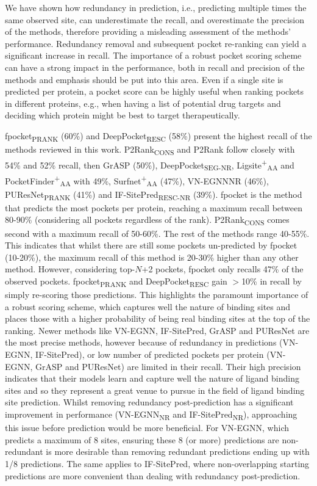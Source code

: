 We have shown how redundancy in prediction, i.e., predicting multiple times the same observed site, can underestimate the recall, and overestimate the precision of the methods, therefore providing a misleading assessment of the methods’ performance. Redundancy removal and subsequent pocket re-ranking can yield a significant increase in recall. The importance of a robust pocket scoring scheme can have a strong impact in the performance, both in recall and precision of the methods and emphasis should be put into this area. Even if a single site is predicted per protein, a pocket score can be highly useful when ranking pockets in different proteins, e.g., when having a list of potential drug targets and deciding which protein might be best to target therapeutically.

fpocket\textsubscript{PRANK} (60\%) and DeepPocket\textsubscript{RESC} (58\%) present the highest recall of the methods reviewed in this work. P2Rank\textsubscript{CONS} and P2Rank follow closely with 54\% and 52\% recall, then GrASP (50\%), DeepPocket\textsubscript{SEG-NR}, Ligsite\textsuperscript{+}\textsubscript{AA} and PocketFinder\textsuperscript{+}\textsubscript{AA} with 49\%, Surfnet\textsuperscript{+}\textsubscript{AA} (47\%), VN-EGNNNR (46\%), PUResNet\textsubscript{PRANK} (41\%) and IF-SitePred\textsubscript{RESC-NR} (39\%). fpocket is the method that predicts the most pockets per protein, reaching a maximum recall between 80-90\% (considering all pockets regardless of the rank). P2Rank\textsubscript{CONS} comes second with a maximum recall of 50-60\%. The rest of the methods range 40-55\%. This indicates that whilst there are still some pockets un-predicted by fpocket (10-20\%), the maximum recall of this method is 20-30\% higher than any other method. However, considering top-$N$+2 pockets, fpocket only recalls 47\% of the observed pockets. fpocket\textsubscript{PRANK} and DeepPocket\textsubscript{RESC} gain $>$10\% in recall by simply re-scoring those predictions. This highlights the paramount importance of a robust scoring scheme, which captures well the nature of binding sites and places those with a higher probability of being real binding sites at the top of the ranking. Newer methods like VN-EGNN, IF-SitePred, GrASP and PUResNet are the most precise methods, however because of redundancy in predictions (VN-EGNN, IF-SitePred), or low number of predicted pockets per protein (VN-EGNN, GrASP and PUResNet) are limited in their recall. Their high precision indicates that their models learn and capture well the nature of ligand binding sites and so they represent a great venue to pursue in the field of ligand binding site prediction. Whilst removing redundancy post-prediction has a significant improvement in performance (VN-EGNN\textsubscript{NR} and IF-SitePred\textsubscript{NR}), approaching this issue before prediction would be more beneficial. For VN-EGNN, which predicts a maximum of 8 sites, ensuring these 8 (or more) predictions are non-redundant is more desirable than removing redundant predictions ending up with 1/8 predictions. The same applies to IF-SitePred, where non-overlapping starting predictions are more convenient than dealing with redundancy post-prediction.

